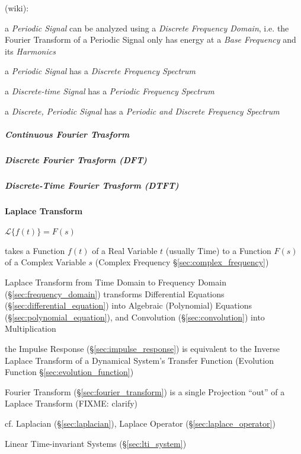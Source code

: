 (wiki):

a \emph{Periodic Signal} can be analyzed using a \emph{Discrete Frequency
  Domain}, i.e. the Fourier Transform of a Periodic Signal only has energy at a
\emph{Base Frequency} and its \emph{Harmonics}

a \emph{Periodic Signal} has a \emph{Discrete Frequency Spectrum}

a \emph{Discrete-time Signal} has a \emph{Periodic Frequency Spectrum}

a \emph{Discrete, Periodic Signal} has a \emph{Periodic and Discrete Frequency
  Spectrum}



\subparagraph{Continuous Fourier Trasform}
\label{sec:continuous_fourier_transform}\hfill

\subparagraph{Discrete Fourier Trasform (DFT)}\label{sec:dft}\hfill

\subparagraph{Discrete-Time Fourier Trasform (DTFT)}\label{sec:dtft}\hfill



\paragraph{Laplace Transform}\label{sec:laplace_transform}\hfill

$\mathcal{L}\{f(t)\} = F(s)$

takes a Function $f(t)$ of a Real Variable $t$ (usually Time) to a Function
$F(s)$ of a Complex Variable $s$ (Complex Frequency
\S\ref{sec:complex_frequency})

Laplace Transform from Time Domain to Frequency Domain
(\S\ref{sec:frequency_domain}) transforms Differential Equations
(\S\ref{sec:differential_equation}) into Algebraic (Polynomial) Equations
(\S\ref{sec:polynomial_equation}), and Convolution (\S\ref{sec:convolution})
into Multiplication

the Impulse Response (\S\ref{sec:impulse_response}) is equivalent to the Inverse
Laplace Transform of a Dynamical System's Transfer Function (Evolution Function
\S\ref{sec:evolution_function})

\fist Fourier Transform (\S\ref{sec:fourier_transform}) is a single Projection
``out'' of a Laplace Transform (FIXME: clarify)

\fist cf. Laplacian (\S\ref{sec:laplacian}), Laplace Operator
(\S\ref{sec:laplace_operator}) %

\fist Linear Time-invariant Systems (\S\ref{sec:lti_system})

